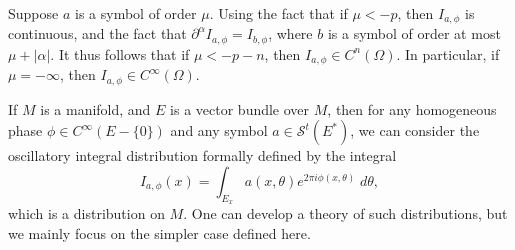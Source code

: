 %
%
%
%
%

\begin{remark}
    Suppose $a$ is a symbol of order $\mu$. Using the fact that if $\mu < -p$, then $I_{a,\phi}$ is continuous, and the fact that $\partial^\alpha I_{a,\phi} = I_{b,\phi}$, where $b$ is a symbol of order at most $\mu + |\alpha|$. It thus follows that if $\mu < -p-n$, then $I_{a,\phi} \in C^n(\Omega)$. In particular, if $\mu = -\infty$, then $I_{a,\phi} \in C^\infty(\Omega)$.
\end{remark}

\begin{remark}
    If $M$ is a manifold, and $E$ is a vector bundle over $M$, then for any homogeneous phase $\phi \in C^\infty(E - \{ 0 \})$ and any symbol $a \in \mathcal{S}^t(E^*)$, we can consider the oscillatory integral distribution formally defined by the integral
    \[ I_{a,\phi}(x) = \int_{E_x} a(x,\theta) e^{2 \pi i \phi(x,\theta)}\; d\theta, \]
    which is a distribution on $M$. One can develop a theory of such distributions, but we mainly focus on the simpler case defined here.
\end{remark}

